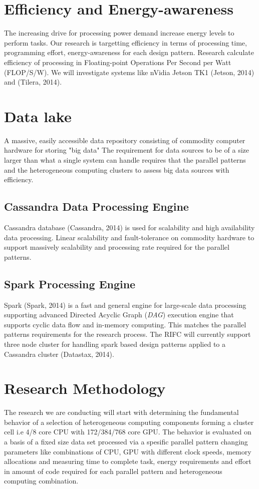 \documentclass{acm_proc_article-sp}
\begin{document}
\section{Efficiency and Energy-awareness}
The increasing drive for processing power demand increase energy levels to perform tasks. Our research is targetting efficiency in terms of processing time, programming effort, energy-awareness for each design pattern. Research calculate efficiency of processing in Floating-point Operations Per Second per Watt (FLOP/S/W). We will investigate systems like nVidia Jetson TK1 (Jetson, 2014) and (Tilera, 2014).
\section{Data lake}
A massive, easily accessible data repository consisting of commodity computer hardware for storing "big data" The requirement for data sources to be of a size larger than what a single system can handle requires that the parallel patterns and the heterogeneous computing clusters to assess big data sources with efficiency. 
\subsection{Cassandra Data Processing Engine}
Cassandra database (Cassandra, 2014) is used for scalability and high availability data processing. Linear scalability and fault-tolerance on commodity hardware to support massively scalability and processing rate required for the parallel patterns.
\subsection{Spark Processing Engine}
Spark (Spark, 2014) is a fast and general engine for large-scale data processing supporting advanced Directed Acyclic Graph (\textit{DAG}) execution engine that supports cyclic data flow and in-memory computing. This matches the parallel patterns requirements for the research process. The RIFC will currently support three node cluster for handling spark based design patterns applied to a Cassandra cluster (Datastax, 2014). 
\section{Research Methodology}
The research we are conducting will start with determining the fundamental behavior of a selection of heterogeneous computing components forming a cluster cell i.e 4/8 core CPU with 172/384/768 core GPU. The behavior is evaluated on a basis of a fixed size data set processed via a spesific parallel pattern changing parameters like combinations of CPU, GPU with different clock speeds, memory allocations and measuring time to complete task, energy requirements and effort in amount of code required for each parallel pattern and heterogeneous computing combination. 
\end{document}
